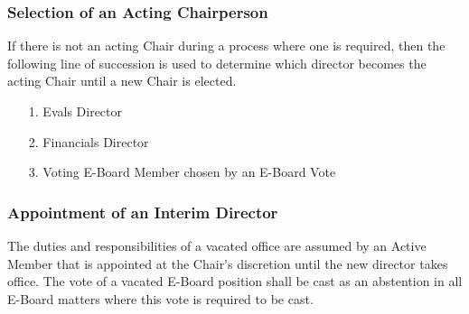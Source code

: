 \documentclass{article}
\newcommand{\asubsection}[1]{\subsubsection{#1} \label{#1}}
\begin{document}
\asubsection{Selection of an Acting Chairperson}
If there is not an acting Chair during a process where one is required, then the following line of succession is used to determine which director becomes the acting Chair until a new Chair is elected.
\begin{enumerate}
	\item[1.] Evals Director
	\item[2.] Financials Director
	\item[3.] Voting E-Board Member chosen by an E-Board Vote
\end{enumerate}

\asubsection{Appointment of an Interim Director}
The duties and responsibilities of a vacated office are assumed by an Active Member that is appointed at the Chair's discretion until the new director takes office. %
The vote of a vacated E-Board position shall be cast as an abstention in all E-Board matters where this vote is required to be cast.
\end{document}
